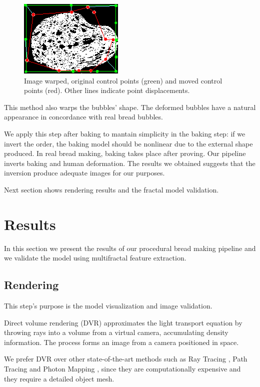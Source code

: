 \documentclass[final,5p,times]{elsarticle}
\begin{document}
\begin{figure}[!ht]
\includegraphics[scale=1.35]{warppoints.png}
\caption{Image warped, original control points (green) and moved control points (red). Other lines indicate point displacements. }
\label{FigMVCpoints}
\end{figure}


This method also warps the bubbles' shape. The deformed bubbles have a natural appearance in concordance with real bread bubbles. 


We apply this step after baking to mantain simplicity in the baking step: if we invert the order, the baking model should be nonlinear due to the external shape produced. In real bread making, baking takes place after proving. Our pipeline inverts baking and human deformation. The results we obtained suggests that the inversion produce adequate images for our purposes.

Next section shows rendering results and the fractal model validation.

\section{Results}
In this section we present the results of our procedural bread making pipeline and we validate the model using multifractal feature extraction.

\subsection{Rendering}
This step's purpose is the model visualization and image validation.

Direct volume rendering (DVR) \cite{Levoy1988, Max1995,Kruger2003} approximates the light transport equation by throwing rays into a volume from a virtual camera, accumulating density information. The process forms an image from a camera positioned in space.

We prefer DVR over other state-of-the-art methods such as Ray Tracing \cite{Whitted1980,Singh2010}, Path Tracing \cite{Lafortune1993} and Photon Mapping \cite{Jensen1996}, since they are computationally expensive and they require a detailed object mesh.
\end{document}
